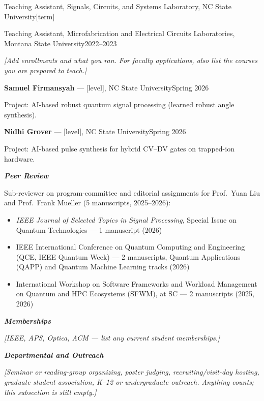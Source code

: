 \documentclass[10.5pt,letterpaper]{article}
\newcommand{\cvsec}[1]{%
  \par\needspace{4\baselineskip}\vspace{11pt}%
  \noindent\makebox[0pt][r]{%
    \smash{\parbox[t]{1.45in}{\raggedright\footnotesize\bfseries\MakeUppercase{#1}}}%
    \hspace{0.30in}}%
  \ignorespaces}
\newcommand{\cvsub}[1]{\par\vspace{7pt}\textbf{\itshape #1}\par\vspace{2pt}}
\newcommand{\entry}[2]{#1\hfill #2\par}
\newcommand{\todo}[1]{{\color{gray}\itshape #1}}
\begin{document}
\vspace{5pt}
\entry{Teaching Assistant, Signals, Circuits, and Systems Laboratory, NC State University}{[term]}
\entry{Teaching Assistant, Microfabrication and Electrical Circuits Laboratories, Montana State University}{2022--2023}

\vspace{4pt}
\todo{[Add enrollments and what you ran. For faculty applications, also list the courses
you are prepared to teach.]}

\cvsec{Mentoring}
\entry{\textbf{Samuel Firmansyah} --- [level], NC State University}{Spring 2026}
Project: AI-based robust quantum signal processing (learned robust angle synthesis).

\vspace{4pt}
\entry{\textbf{Nidhi Grover} --- [level], NC State University}{Spring 2026}
Project: AI-based pulse synthesis for hybrid CV--DV gates on trapped-ion hardware.

\cvsec{Professional\\Service}
\cvsub{Peer Review}
Sub-reviewer on program-committee and editorial assignments for Prof.\ Yuan Liu and
Prof.\ Frank Mueller (5 manuscripts, 2025--2026):
\begin{itemize}
  \item \emph{IEEE Journal of Selected Topics in Signal Processing}, Special Issue on
        Quantum Technologies --- 1 manuscript (2026)
  \item IEEE International Conference on Quantum Computing and Engineering (QCE, IEEE
        Quantum Week) --- 2 manuscripts, Quantum Applications (QAPP) and Quantum Machine
        Learning tracks (2026)
  \item International Workshop on Software Frameworks and Workload Management on Quantum
        and HPC Ecosystems (SFWM), at SC --- 2 manuscripts (2025, 2026)
\end{itemize}

\cvsub{Memberships}
\todo{[IEEE, APS, Optica, ACM --- list any current student memberships.]}

\cvsub{Departmental and Outreach}
\todo{[Seminar or reading-group organizing, poster judging, recruiting/visit-day hosting,
graduate student association, K--12 or undergraduate outreach. Anything counts; this
subsection is still empty.]}
\end{document}
